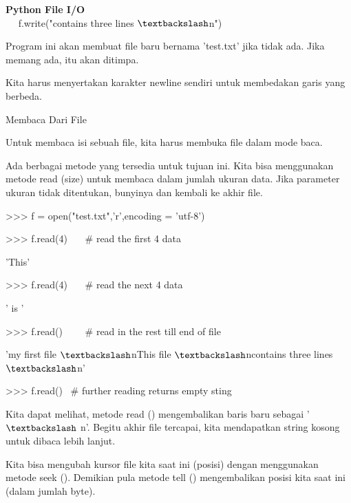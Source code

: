 \begin{center}{\fontsize{24pt}{24pt}\selectfont \textbf{Python File I/O} \\}
~~ f.write("contains three lines $  \textbackslash  $n") 
\vspace{12pt}

Program ini akan membuat file baru bernama 'test.txt' jika tidak ada. Jika memang ada, itu akan ditimpa. 
\vspace{12pt}

Kita harus menyertakan karakter newline sendiri untuk membedakan garis yang berbeda. 

Membaca Dari File 
\vspace{12pt}

Untuk membaca isi sebuah file, kita harus membuka file dalam mode baca. 
\vspace{12pt}
 
Ada berbagai metode yang tersedia untuk tujuan ini. Kita bisa menggunakan metode read (size) untuk membaca dalam jumlah ukuran data. Jika parameter ukuran tidak ditentukan, bunyinya dan kembali ke akhir file. 
\vspace{12pt}
\vspace{12pt}

>>> f = open("test.txt",'r',encoding = 'utf-8') 

>>> f.read(4)~~~  $  \#  $ read the first 4 data \

'This' 
\vspace{12pt}

>>> f.read(4)~~~  $  \#  $ read the next 4 data 

' is ' 
\vspace{12pt}
 
>>> f.read()~~~~  $  \#  $ read in the rest till end of file 

'my first file $  \textbackslash  $nThis file $  \textbackslash  $ncontains three lines $  \textbackslash  $n' 
\vspace{12pt}
 
>>> f.read()~  $  \#  $ further reading returns empty sting 
\vspace{12pt}
\vspace{12pt}

Kita dapat melihat, metode read () mengembalikan baris baru sebagai ' $  \textbackslash  $ n'. Begitu akhir file tercapai, kita mendapatkan string kosong untuk dibaca lebih lanjut. 
\vspace{12pt}

Kita bisa mengubah kursor file kita saat ini (posisi) dengan menggunakan metode seek (). Demikian pula metode tell () mengembalikan posisi kita saat ini (dalam jumlah byte). 
\vspace{12pt}


\end{center}
